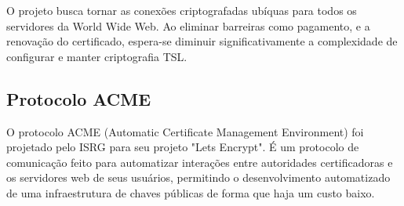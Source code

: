 \documentclass{article}
\begin{document}
O projeto busca tornar as conexões criptografadas ubíquas para todos os servidores da World Wide Web. Ao eliminar barreiras como pagamento, e a renovação do certificado, espera-se diminuir significativamente a complexidade de configurar e manter criptografia TSL.
\subsection{Protocolo ACME}
O protocolo ACME (Automatic Certificate Management Environment) foi projetado pelo ISRG para seu projeto "Lets Encrypt". É um protocolo de comunicação feito para automatizar interações entre autoridades certificadoras e os servidores web de seus usuários, permitindo o desenvolvimento automatizado de uma infraestrutura de chaves públicas de forma que haja um custo baixo. 
\end{document}
